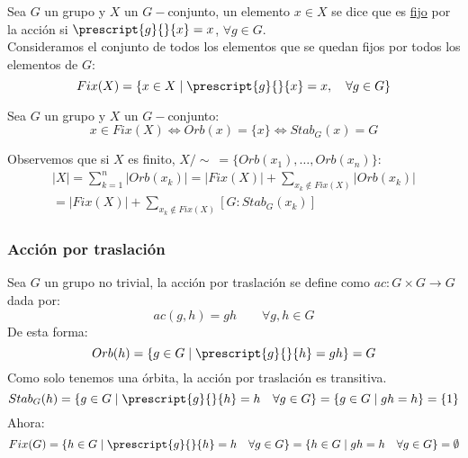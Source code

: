 \begin{definicion}
    Sea $G$ un grupo y $X$ un $G-$conjunto, un elemento $x\in X$ se dice que es \underline{fijo} por la acción si $\prescript{g}{}{x} = x$, $\forall g\in G$.\\

    \noindent
    Consideramos el conjunto de todos los elementos que se quedan fijos por todos los elementos de $G$:
    \begin{equation*}
        Fix(X) = \{x\in X \mid \prescript{g}{}{x} = x, \quad \forall g\in G\}
    \end{equation*}
\end{definicion}

\begin{prop}
    Sea $G$ un grupo y $X$ un $G-$conjunto:
    \begin{equation*}
        x\in Fix(X) \Longleftrightarrow Orb(x) = \{x\} \Longleftrightarrow Stab_G(x) = G
    \end{equation*}
\end{prop}

\noindent
Observemos que si $X$ es finito, $X/\sim\ = \{Orb(x_1), \ldots, Orb(x_n)\}$:
\begin{multline*}
    |X| = \sum_{k=1}^{n} |Orb(x_k)| = |Fix(X)| + \sum_{x_k \notin Fix(X)} |Orb(x_k)| \\ = |Fix(X)| + \sum_{x_k \notin Fix(X)} [G:Stab_G(x_k)]
\end{multline*}

\subsubsection{Acción por traslación}
\noindent
Sea $G$ un grupo no trivial, la acción por traslación se define como $ac:G\times G\to G$ dada por:
\begin{equation*}
    ac(g,h) = gh \qquad \forall g,h\in G
\end{equation*}
De esta forma:
\begin{equation*}
    Orb(h) = \{g\in G \mid \prescript{g}{}{h} = gh\} = G
\end{equation*}
Como solo tenemos una órbita, la acción por traslación es transitiva.
\begin{equation*}
    Stab_G(h) = \{g\in G \mid \prescript{g}{}{h} = h \quad \forall g\in G\} = \{g\in G \mid gh = h\} = \{1\}
\end{equation*}
Ahora:
\begin{equation*}
    Fix(G) = \{h\in G \mid \prescript{g}{}{h} = h \quad \forall g\in G\} = \{h\in G \mid gh = h \quad \forall g\in G\} = \emptyset 
\end{equation*}

